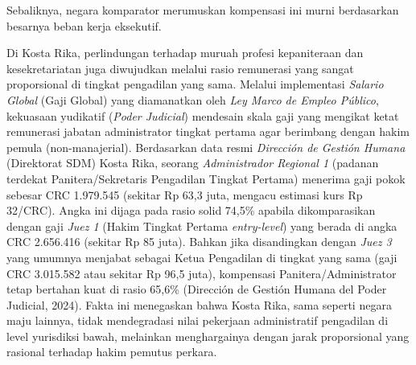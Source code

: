 \documentclass[12pt, a4paper]{article}
\begin{document}
Sebaliknya, negara komparator merumuskan kompensasi ini murni berdasarkan besarnya beban kerja eksekutif. 

Di Kosta Rika, perlindungan terhadap muruah profesi kepaniteraan dan kesekretariatan juga diwujudkan melalui rasio remunerasi yang sangat proporsional di tingkat pengadilan yang sama. Melalui implementasi \textit{Salario Global} (Gaji Global) yang diamanatkan oleh \textit{Ley Marco de Empleo Público}, kekuasaan yudikatif (\textit{Poder Judicial}) mendesain skala gaji yang mengikat ketat remunerasi jabatan administrator tingkat pertama agar berimbang dengan hakim pemula (non-manajerial). Berdasarkan data resmi \textit{Dirección de Gestión Humana} (Direktorat SDM) Kosta Rika, seorang \textit{Administrador Regional 1} (padanan terdekat Panitera/Sekretaris Pengadilan Tingkat Pertama) menerima gaji pokok sebesar CRC 1.979.545 (sekitar Rp 63,3 juta, mengacu estimasi kurs Rp 32/CRC). Angka ini dijaga pada rasio solid 74,5\% apabila dikomparasikan dengan gaji \textit{Juez 1} (Hakim Tingkat Pertama \textit{entry-level}) yang berada di angka CRC 2.656.416 (sekitar Rp 85 juta). Bahkan jika disandingkan dengan \textit{Juez 3} yang umumnya menjabat sebagai Ketua Pengadilan di tingkat yang sama (gaji CRC 3.015.582 atau sekitar Rp 96,5 juta), kompensasi Panitera/Administrator tetap bertahan kuat di rasio 65,6\% (Dirección de Gestión Humana del Poder Judicial, 2024). Fakta ini menegaskan bahwa Kosta Rika, sama seperti negara maju lainnya, tidak mendegradasi nilai pekerjaan administratif pengadilan di level yurisdiksi bawah, melainkan menghargainya dengan jarak proporsional yang rasional terhadap hakim pemutus perkara.
\end{document}
